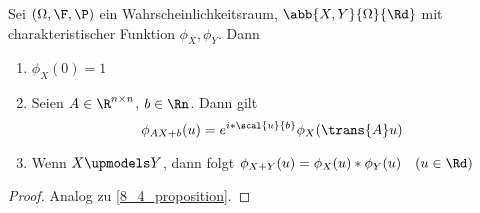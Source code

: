 \begin{proposition}[Rechenregeln]
	\label{8_10_proposition}
	Sei $(\Omega,\F,\P)$ ein Wahrscheinlichkeitsraum, $\abb{X,Y}{\Omega}{\Rd}$ mit charakteristischer Funktion $\phi_X,\phi_Y$. Dann
	\begin{enumerate}[leftmargin=*, nolistsep]
		\item $\phi_X(0) = 1$
		\item Seien $A \in \R^{n \times n}$, $b \in \Rn$. Dann gilt
			\begin{equation*}
				\phi_{AX + b}(u) = e^{i * \scal{u}{b}} \phi_X(\trans{A} u)
			\end{equation*} 
		\item Wenn $X \upmodels Y$, dann folgt $\phi_{X+Y}(u) = \phi_X(u) * \phi_Y(u) \quad (u \in \Rd)$
	\end{enumerate}
\end{proposition}
\begin{proof}
	Analog zu \cref{8_4_proposition}.
\end{proof}

